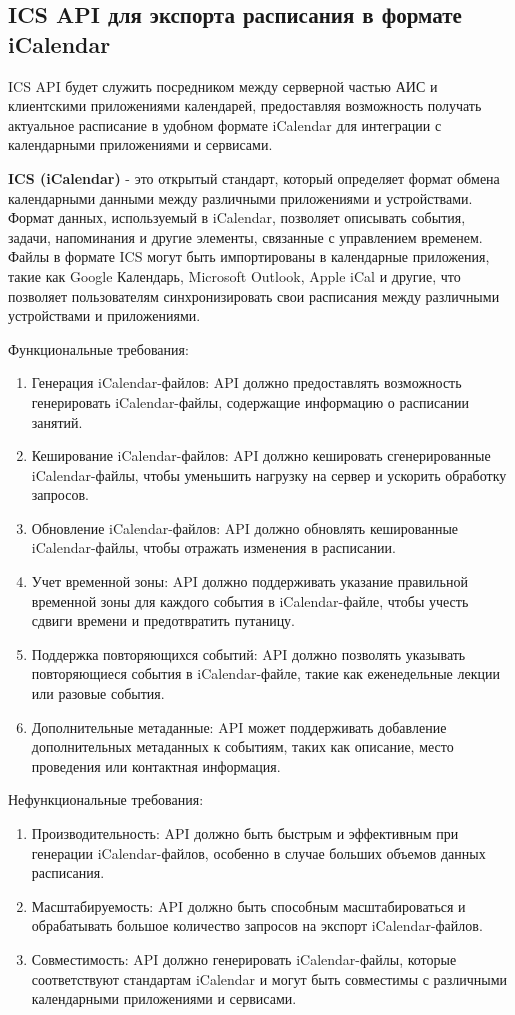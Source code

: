 \subsection{ICS API для экспорта расписания в формате iCalendar}
ICS API будет служить посредником между серверной частью АИС и клиентскими
приложениями календарей,
предоставляя возможность получать актуальное расписание в удобном формате iCalendar
для интеграции с календарными приложениями и сервисами.

\textbf{ICS (iCalendar)} - это открытый стандарт,
который определяет формат обмена календарными данными между различными приложениями и устройствами.
Формат данных, используемый в iCalendar, позволяет описывать события, задачи, напоминания и другие элементы,
связанные с управлением временем. Файлы в формате ICS могут быть импортированы в календарные приложения,
такие как Google Календарь, Microsoft Outlook, Apple iCal и другие,
что позволяет пользователям синхронизировать свои расписания между различными устройствами и приложениями.

Функциональные требования:
\begin{enumerate}
  \item Генерация iCalendar-файлов: API должно предоставлять возможность генерировать iCalendar-файлы,
  содержащие информацию о расписании занятий.
  \item Кеширование iCalendar-файлов: API должно кешировать сгенерированные iCalendar-файлы,
  чтобы уменьшить нагрузку на сервер и ускорить обработку запросов.
  \item Обновление iCalendar-файлов: API должно обновлять кешированные iCalendar-файлы,
  чтобы отражать изменения в расписании.
  \item Учет временной зоны: API должно поддерживать указание правильной временной зоны
  для каждого события в iCalendar-файле, чтобы учесть сдвиги времени и предотвратить путаницу.
  \item Поддержка повторяющихся событий: API должно позволять указывать повторяющиеся события в
  iCalendar-файле, такие как еженедельные лекции или разовые события.
  \item Дополнительные метаданные: API может поддерживать добавление дополнительных
  метаданных к событиям, таких как описание, место проведения или контактная информация.
\end{enumerate}

Нефункциональные требования:
\begin{enumerate}
  \item Производительность: API должно быть быстрым и эффективным при генерации iCalendar-файлов,
  особенно в случае больших объемов данных расписания.
  \item Масштабируемость: API должно быть способным масштабироваться и
  обрабатывать большое количество запросов на экспорт iCalendar-файлов.
  \item Совместимость: API должно генерировать iCalendar-файлы,
  которые соответствуют стандартам iCalendar и могут быть совместимы
  с различными календарными приложениями и сервисами.
\end{enumerate}


